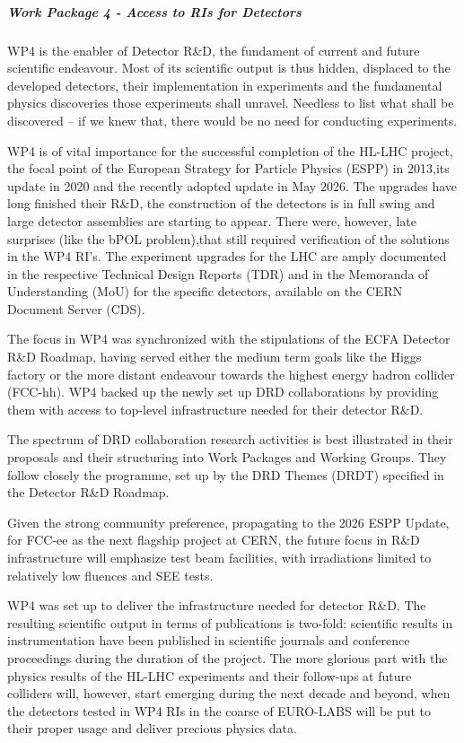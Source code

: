 %
% 
\subparagraph{Work Package 4 - Access to RIs for Detectors} \mbox{}


WP4 is the enabler of Detector R\&D, the fundament of current and future scientific endeavour. Most of its scientific output is thus hidden, displaced to the developed detectors, their implementation in experiments and the fundamental physics discoveries those experiments shall unravel. Needless to list what shall be discovered – if we knew that, there would be no need for conducting experiments.



WP4 is of vital importance for the successful completion of the HL-LHC project, the focal point of the European Strategy for Particle Physics (ESPP) in 2013,its update in 2020 and the recently adopted update in May 2026. The upgrades have long finished their R\&D, the construction of the detectors is in full swing and large detector assemblies are starting to appear. There were, however, late surprises (like the bPOL problem),that still required verification of the solutions in the WP4 RI’s. The experiment upgrades for the LHC are amply documented in the respective Technical Design Reports (TDR) and in the Memoranda of Understanding (MoU) for the specific detectors, available on the CERN Document Server (CDS).


The focus in WP4 was synchronized with the stipulations of the ECFA Detector R\&D Roadmap, having served either the medium term goals like the Higgs factory or the more distant endeavour towards the highest energy hadron collider (FCC-hh). WP4 backed up the newly set up DRD collaborations by providing them with access to top-level infrastructure needed for their detector R\&D.  


The spectrum of DRD collaboration research activities is best illustrated in their proposals and their structuring into Work Packages and Working Groups. They follow closely the programme, set up by  the DRD Themes (DRDT) specified in the Detector R\&D Roadmap.

Given the strong community preference, propagating to the 2026 ESPP Update, for FCC-ee as the next flagship project at CERN, the future focus in R\&D infrastructure will emphasize test beam facilities, with irradiations limited to relatively low fluences and SEE tests.



WP4 was set up to deliver the infrastructure needed for detector R\&D. The resulting scientific output in terms of publications is two-fold: scientific results in instrumentation have been published in scientific journals and conference proceedings during the duration of the project. The more glorious part with the physics results of the HL-LHC experiments and their follow-ups at future colliders will, however, start emerging during the next decade and beyond, when the detectors tested in WP4 RIs in the coarse of EURO-LABS will be put to their proper usage and deliver precious physics data.


